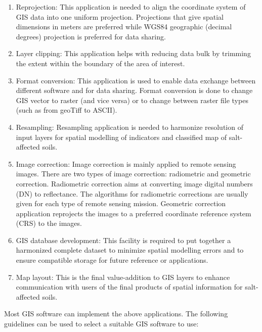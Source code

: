 \documentclass[
  10pt,
  b5paper,
]{book}
\providecommand{\tightlist}{%
  \setlength{\itemsep}{0pt}\setlength{\parskip}{0pt}}
\begin{document}
\begin{enumerate}
\def\labelenumi{\alph{enumi})}
\tightlist
\item
  Reprojection: This application is needed to align the coordinate system of GIS data into one uniform projection. Projections that give spatial dimensions in meters are preferred while WGS84 geographic (decimal degrees) projection is preferred for data sharing.\\
\item
  Layer clipping: This application helps with reducing data bulk by trimming the extent within the boundary of the area of interest.\\
\item
  Format conversion: This application is used to enable data exchange between different software and for data sharing. Format conversion is done to change GIS vector to raster (and vice versa) or to change between raster file types (such as from geoTiff to ASCII).
\item
  Resampling: Resampling application is needed to harmonize resolution of input layers for spatial modelling of indicators and classified map of salt-affected soils.\\
\item
  Image correction: Image correction is mainly applied to remote sensing images. There are two types of image correction: radiometric and geometric correction. Radiometric correction aims at converting image digital numbers (DN) to reflectance. The algorithms for radiometric corrections are usually given for each type of remote sensing mission. Geometric correction application reprojects the images to a preferred coordinate reference system (CRS) to the images.\\
\item
  GIS database development: This facility is required to put together a harmonized complete dataset to minimize spatial modelling errors and to ensure compatible storage for future reference or applications.\\
\item
  Map layout: This is the final value-addition to GIS layers to enhance communication with users of the final products of spatial information for salt-affected soils.
\end{enumerate}

Most GIS software can implement the above applications. The following guidelines can be used to select a suitable GIS software to use:
\end{document}
